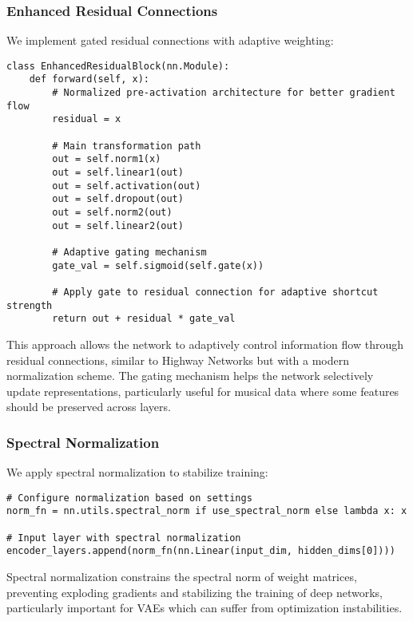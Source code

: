 \documentclass[12pt,a4paper]{article}
\begin{document}
\subsubsection{Enhanced Residual Connections}

We implement gated residual connections with adaptive weighting:

\begin{verbatim}
class EnhancedResidualBlock(nn.Module):
    def forward(self, x):
        # Normalized pre-activation architecture for better gradient flow
        residual = x
        
        # Main transformation path
        out = self.norm1(x)
        out = self.linear1(out)
        out = self.activation(out)
        out = self.dropout(out)
        out = self.norm2(out)
        out = self.linear2(out)
        
        # Adaptive gating mechanism
        gate_val = self.sigmoid(self.gate(x))
        
        # Apply gate to residual connection for adaptive shortcut strength
        return out + residual * gate_val
\end{verbatim}

This approach allows the network to adaptively control information flow through residual connections, similar to Highway Networks \cite{srivastava2015highway} but with a modern normalization scheme. The gating mechanism helps the network selectively update representations, particularly useful for musical data where some features should be preserved across layers.

\subsubsection{Spectral Normalization}

We apply spectral normalization to stabilize training:

\begin{verbatim}
# Configure normalization based on settings
norm_fn = nn.utils.spectral_norm if use_spectral_norm else lambda x: x

# Input layer with spectral normalization
encoder_layers.append(norm_fn(nn.Linear(input_dim, hidden_dims[0])))
\end{verbatim}

Spectral normalization \cite{miyato2018spectral} constrains the spectral norm of weight matrices, preventing exploding gradients and stabilizing the training of deep networks, particularly important for VAEs which can suffer from optimization instabilities.
\end{document}
